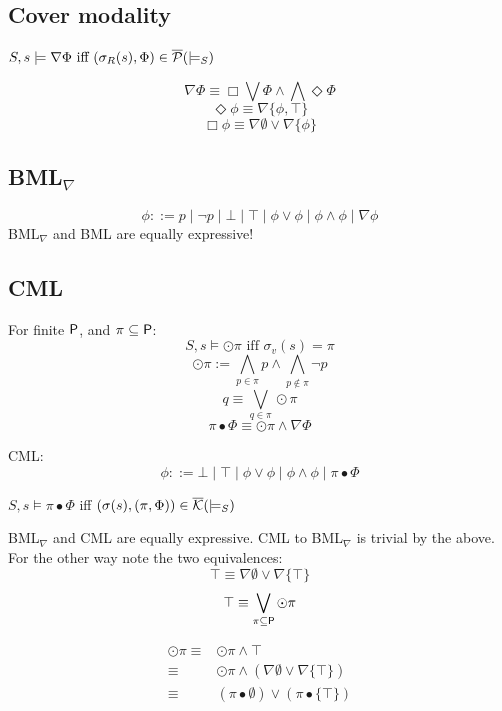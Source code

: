   \subsection{Cover modality}
  \label{sec:cover-modality}
  \begin{definition}
    $S,s \models \nabla\Phi \text{ iff } (\sigma_{R}(s),\Phi) \in \overline {\mathcal{P}}(\models_{S})$\label{def:2}
  \end{definition}
  \[\nabla\Phi \equiv \Box\bigvee\Phi \land \bigwedge \Diamond\Phi  \]
  \[\Diamond \phi \equiv \nabla\{\phi,\top\}\]
  \[\Box \phi \equiv \nabla\emptyset \lor \nabla\{\phi\} \]

  \subsection{BML$_\nabla$}
  \[\phi ::= p \mid \neg p \mid \bot \mid \top \mid \phi \lor \phi \mid \phi \land \phi \mid \nabla\phi\]
  BML$_\nabla$ and BML are equally expressive!

  \subsection{CML}
  \label{sec:cml}
  For finite $\mathsf{P}$, and $\pi \subseteq \mathsf{P}$:
  \[S,s \models \odot \pi \text{ iff } \sigma_{v}(s) = \pi\]
  \[\odot \pi := \bigwedge_{p \in \pi}p \land \bigwedge_{p \notin \pi} \neg p\]
  \[q \equiv \bigvee_{q \in \pi} \odot \pi\]
  \[\pi \bullet \Phi \equiv \odot\pi \land \nabla\Phi\]

  CML:
  \[\phi ::= \bot \mid \top \mid \phi \lor \phi \mid \phi \land \phi \mid \pi \bullet \Phi\]

  \begin{proposition}
    \label{proof:2}
    $S,s \models \pi \bullet \Phi$ iff $(\sigma(s),(\pi,\Phi)) \in \overline {\mathcal{K}}(\models_{S})$
  \end{proposition}

  \begin{theorem}
    \label{thr:1}
    BML$_\nabla$ and CML are equally expressive. CML to BML$_\nabla$ is trivial by the
    above. For the other way note the two equivalences:
    \[\top \equiv \nabla\emptyset \lor \nabla\{\top\}\]
    \[\top \equiv \bigvee_{\pi \subseteq \mathsf{P}} \odot\pi\]

    \begin{align*}
      \odot\pi \equiv& \odot\pi \land \top\\
      \equiv& \odot\pi \land (\nabla\emptyset \lor \nabla\{\top\})\\
      \equiv& (\pi \bullet \emptyset) \lor (\pi \bullet \{\top\})
    \end{align*}

  \end{theorem}

